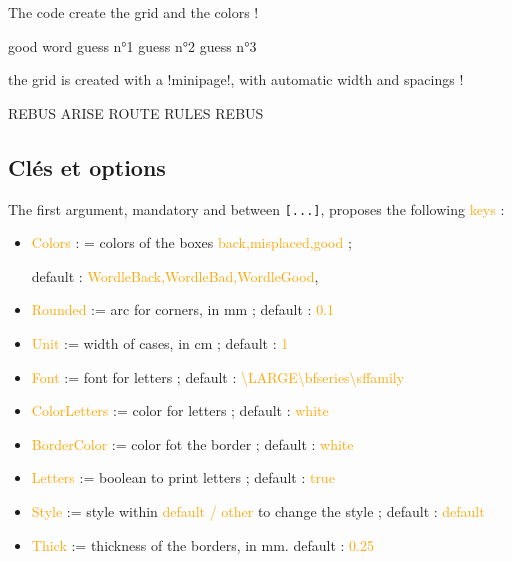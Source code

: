 \documentclass[english,a4paper,11pt]{article}
\newcommand\Cle[1]{{\small\sffamily\textlangle \textcolor{orange}{#1}\textrangle}}
\begin{document}
{\begin{cautionblock}
The code create the grid and the colors !
\end{cautionblock}

\begin{DemoCode}
\begin{WordleGrid}[keys]{good word}
	guess n°1
	guess n°2
	guess n°3
\end{WordleGrid}
\end{DemoCode}

\begin{noteblock}
the grid is created with a \motcletex!minipage!, with automatic width and spacings !
\end{noteblock}

\begin{DemoCode}[]
\begin{WordleGrid}{REBUS}
	ARISE
	ROUTE
	RULES
	REBUS
\end{WordleGrid}
\end{DemoCode}

\subsection{Clés et options}

\begin{tipblock}
The first argument, mandatory and between \texttt{[...]}, proposes the following \Cle{keys} :

\begin{itemize}
	\item \Cle{Colors} : = colors of the boxes \Cle{back,misplaced,good} ;
	
	\hfill{}default : \Cle{WordleBack,WordleBad,WordleGood},%
	\item \Cle{Rounded} := arc for corners, in mm ; \hfill{}default : \Cle{0.1}
	\item \Cle{Unit} := width of cases, in cm ; \hfill{}default : \Cle{1}
	\item \Cle{Font} := font for letters ; \hfill{}default : \Cle{\textbackslash LARGE\textbackslash bfseries\textbackslash sffamily}
	\item \Cle{ColorLetters} := color for letters ; \hfill{}default : \Cle{white}
	\item \Cle{BorderColor} := color fot the border ; \hfill{}default : \Cle{white}
	\item \Cle{Letters} := boolean to print letters ; \hfill{}default : \Cle{true}
	\item \Cle{Style} := style within \Cle{default / other} to change the style ; \hfill{}default : \Cle{default}
	\item \Cle{Thick} := thickness of the borders, in mm. \hfill{}default : \Cle{0.25}
\end{itemize}
\vspace*{-\baselineskip}\leavevmode
\end{tipblock}

}
\end{document}
